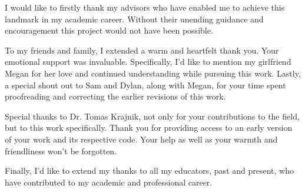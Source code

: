 

    \begin{acknowledgements}
      I would like to firstly thank my advisors who have enabled me to achieve
      this landmark in my academic career. Without their unending guidance and
      encouragement this project would not have been possible.

      To my friends and family, I extended a warm and heartfelt thank you. Your
      emotional support was invaluable. Specifically, I'd like to mention
      my girlfriend Megan for her love and continued understanding while
      pursuing this work. Lastly, a special shout out to Sam and Dylan, along
      with Megan, for your time spent proofreading and correcting the earlier
      revisions of this work.

      Special thanks to Dr. Tomas Krajnik, not only for your contributions to
      the field, but to this work specifically. Thank you for providing access
      to an early version of your work and its respective code. Your help
      as well as your warmth and friendliness won't be forgotten.

      Finally, I'd like to extend my thanks to all my educators, past and present,
      who have contributed to my academic and professional career.

    \end{acknowledgements}

